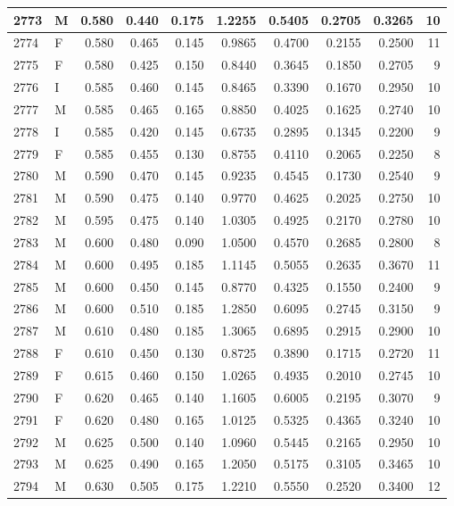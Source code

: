 \documentclass[9pt,twocolumn,twoside,]{pnas-new}
\begin{document}
\begin{tabular}{l|l|r|r|r|r|r|r|r|r}
\hline
2773 & M & 0.580 & 0.440 & 0.175 & 1.2255 & 0.5405 & 0.2705 & 0.3265 & 10\\
\hline
2774 & F & 0.580 & 0.465 & 0.145 & 0.9865 & 0.4700 & 0.2155 & 0.2500 & 11\\
\hline
2775 & F & 0.580 & 0.425 & 0.150 & 0.8440 & 0.3645 & 0.1850 & 0.2705 & 9\\
\hline
2776 & I & 0.585 & 0.460 & 0.145 & 0.8465 & 0.3390 & 0.1670 & 0.2950 & 10\\
\hline
2777 & M & 0.585 & 0.465 & 0.165 & 0.8850 & 0.4025 & 0.1625 & 0.2740 & 10\\
\hline
2778 & I & 0.585 & 0.420 & 0.145 & 0.6735 & 0.2895 & 0.1345 & 0.2200 & 9\\
\hline
2779 & F & 0.585 & 0.455 & 0.130 & 0.8755 & 0.4110 & 0.2065 & 0.2250 & 8\\
\hline
2780 & M & 0.590 & 0.470 & 0.145 & 0.9235 & 0.4545 & 0.1730 & 0.2540 & 9\\
\hline
2781 & M & 0.590 & 0.475 & 0.140 & 0.9770 & 0.4625 & 0.2025 & 0.2750 & 10\\
\hline
2782 & M & 0.595 & 0.475 & 0.140 & 1.0305 & 0.4925 & 0.2170 & 0.2780 & 10\\
\hline
2783 & M & 0.600 & 0.480 & 0.090 & 1.0500 & 0.4570 & 0.2685 & 0.2800 & 8\\
\hline
2784 & M & 0.600 & 0.495 & 0.185 & 1.1145 & 0.5055 & 0.2635 & 0.3670 & 11\\
\hline
2785 & M & 0.600 & 0.450 & 0.145 & 0.8770 & 0.4325 & 0.1550 & 0.2400 & 9\\
\hline
2786 & M & 0.600 & 0.510 & 0.185 & 1.2850 & 0.6095 & 0.2745 & 0.3150 & 9\\
\hline
2787 & M & 0.610 & 0.480 & 0.185 & 1.3065 & 0.6895 & 0.2915 & 0.2900 & 10\\
\hline
2788 & F & 0.610 & 0.450 & 0.130 & 0.8725 & 0.3890 & 0.1715 & 0.2720 & 11\\
\hline
2789 & F & 0.615 & 0.460 & 0.150 & 1.0265 & 0.4935 & 0.2010 & 0.2745 & 10\\
\hline
2790 & F & 0.620 & 0.465 & 0.140 & 1.1605 & 0.6005 & 0.2195 & 0.3070 & 9\\
\hline
2791 & F & 0.620 & 0.480 & 0.165 & 1.0125 & 0.5325 & 0.4365 & 0.3240 & 10\\
\hline
2792 & M & 0.625 & 0.500 & 0.140 & 1.0960 & 0.5445 & 0.2165 & 0.2950 & 10\\
\hline
2793 & M & 0.625 & 0.490 & 0.165 & 1.2050 & 0.5175 & 0.3105 & 0.3465 & 10\\
\hline
2794 & M & 0.630 & 0.505 & 0.175 & 1.2210 & 0.5550 & 0.2520 & 0.3400 & 12\\

\end{tabular}
\end{document}
